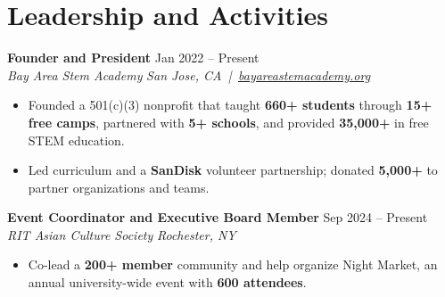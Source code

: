 \documentclass[10pt,letterpaper]{article}
\newif\ifresumeFirstRole
\newcommand{\resumeRole}[4]{%
  \ifresumeFirstRole
    \global\resumeFirstRolefalse
  \else
    \vspace{0pt plus 1fill}%
  \fi
  \textbf{#1} \hfill #2\\
  \textit{#3} \hfill \textit{#4}
}
\begin{document}
\section*{Leadership and Activities}
\resumeRole{Founder and President}{Jan 2022 -- Present}{Bay Area Stem Academy}{San Jose, CA \,|\, \href{https://bayareastemacademy.org}{bayareastemacademy.org}}
\begin{itemize}
  \item Founded a 501(c)(3) nonprofit that taught \textbf{660+ students} through \textbf{15+ free camps}, partnered with \textbf{5+ schools}, and provided \textbf{\textdollar{}35,000+} in free STEM education.
  \item Led curriculum and a \textbf{SanDisk} volunteer partnership; donated \textbf{\textdollar{}5,000+} to partner organizations and teams.
\end{itemize}

\resumeRole{Event Coordinator and Executive Board Member}{Sep 2024 -- Present}{RIT Asian Culture Society}{Rochester, NY}
\begin{itemize}
  \item Co-lead a \textbf{200+ member} community and help organize Night Market, an annual university-wide event with \textbf{600 attendees}.
\end{itemize}
\end{document}
